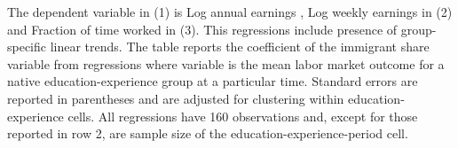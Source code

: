 \begin{table}[H]
\begin{center}
\begin{tablenotes}
\begin{small}
\item
The dependent variable in (1) is Log annual earnings , Log weekly earnings in (2) and Fraction of time worked in (3). This regressions include presence of group-specific linear trends. The table reports the coefficient of the immigrant share variable from regressions where variable is  the mean labor market outcome for a native education-experience group at a particular time. Standard errors are reported in parentheses and are adjusted for clustering within education-experience cells. All regressions have 160
observations and, except for those reported in row 2, are sample size of the education-experience-period cell.
\end{small}
\end{tablenotes} 

\end{center}
\end{table}